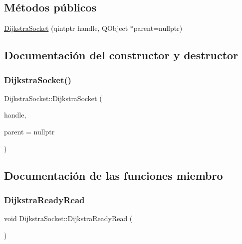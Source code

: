 \subsection*{Métodos públicos}
\begin{DoxyCompactItemize}
\item 
\hyperlink{class_dijkstra_socket_ab788220c12a6f985d5b036d69205b5e6}{Dijkstra\+Socket} (qintptr handle, Q\+Object $\ast$parent=nullptr)
\end{DoxyCompactItemize}


\subsection{Documentación del constructor y destructor}
\mbox{\label{class_dijkstra_socket_ab788220c12a6f985d5b036d69205b5e6}} 
\subsubsection{\texorpdfstring{Dijkstra\+Socket()}{DijkstraSocket()}}
{\footnotesize\ttfamily Dijkstra\+Socket\+::\+Dijkstra\+Socket (\begin{DoxyParamCaption}\item[{qintptr}]{handle,  }\item[{Q\+Object $\ast$}]{parent = {\ttfamily nullptr} }\end{DoxyParamCaption})}



\subsection{Documentación de las funciones miembro}
\mbox{\label{class_dijkstra_socket_ad942276d377f42992ac9dfd5fe32219c}} 
\subsubsection{\texorpdfstring{Dijkstra\+Ready\+Read}{DijkstraReadyRead}}
{\footnotesize\ttfamily void Dijkstra\+Socket\+::\+Dijkstra\+Ready\+Read (\begin{DoxyParamCaption}\item[{\hyperlink{class_dijkstra_socket}{Dijkstra\+Socket} $\ast$}]{ }\end{DoxyParamCaption})\hspace{0.3cm}{\ttfamily [signal]}}

